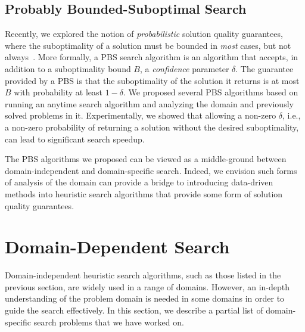 \documentclass{article}
\newcommand{\pbs}{\ac{PBS}\xspace}
\begin{document}
\subsection{Probably Bounded-Suboptimal Search}
Recently, we explored the notion of \emph{probabilistic} solution quality guarantees, where the suboptimality of a solution must be bounded in \emph{most} cases, but not always~\cite{stern2019probably}. 
More formally, a \pbs search algorithm is an algorithm that accepts, in addition to a suboptimality bound $B$, a \emph{confidence} parameter $\delta$. The guarantee provided by a \pbs is that the suboptimality of the solution it returns is at most $B$ with probability at least $1-\delta$. 
We proposed several \pbs algorithms based on running an anytime search algorithm and analyzing the domain and previously solved problems in it. Experimentally, we showed that allowing a non-zero $\delta$, i.e., a non-zero probability of returning a solution without the desired suboptimality, can lead to significant search speedup. 


The \pbs algorithms we proposed can be viewed as a middle-ground between domain-independent and domain-specific search. Indeed, we envision such forms of analysis of the domain can provide a bridge to introducing data-driven methods into heuristic search algorithms that provide some form of solution quality guarantees. 






\section{Domain-Dependent Search}
Domain-independent heuristic search algorithms, such as those listed in the previous section, are widely used in a range of domains. 
However, an in-depth understanding of the problem domain is needed in some domains in order to guide the search effectively. 
In this section, we  describe a partial list of domain-specific search problems that we have worked on. %
\end{document}
